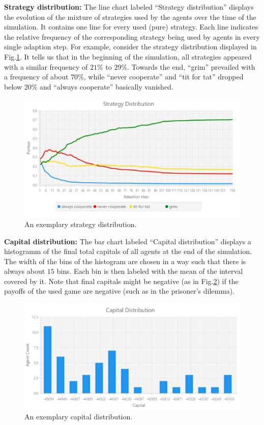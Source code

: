 \documentclass[parskip=full,11pt]{scrartcl}
\newcommand*\circled[1]{\tikz[baseline=(char.base)]{
            \node[shape=circle,draw,inner sep=2pt] (char) {#1};}}
\begin{document}
\textbf{Strategy distribution:} The line chart labeled \enquote{Strategy distribution} \circled{2} displays the evolution of the mixture of strategies used by the agents over the time of the simulation. It contains one line for every used (pure) strategy. Each line indicates the relative frequency of the corresponding strategy being used by agents in every single adaption step. For example, consider the strategy distribution displayed in Fig.\ref{fig:strategy_distribution}. It tells us that in the beginning of the simulation, all strategies appeared with a similar frequency of \(21\%\) to \(29\%\). Towards the end, \enquote{grim} prevailed with a frequency of about \(70\%\), while \enquote{never cooperate} and \enquote{tit for tat} dropped below \(20\%\) and \enquote{always cooperate} basically vanished.

\begin{figure}[h]
	\centering
	\includegraphics[width=0.8\linewidth]{img_manual/strategy_distribution.png}
	\caption{An exemplary strategy distribution.}
	\label{fig:strategy_distribution}
\end{figure}

\textbf{Capital distribution:} The bar chart labeled \enquote{Capital distribution} \circled{3} displays a histogramm of the final total capitals of all agents at the end of the simulation. The width of the bins of the histogram are chosen in a way such that there is always about \(15\) bins. Each bin is then labeled with the mean of the interval covered by it. Note that final capitals might be negative (as in Fig.\ref{fig:capital_distribution}) if the payoffs of the used game are negative (such as in the prisoner's dilemma).

\begin{figure}[h]
	\centering
	\includegraphics[width=0.8\linewidth]{img_manual/capital_distribution.png}
	\caption{An exemplary capital distribution.}
	\label{fig:capital_distribution}
\end{figure}
\end{document}
